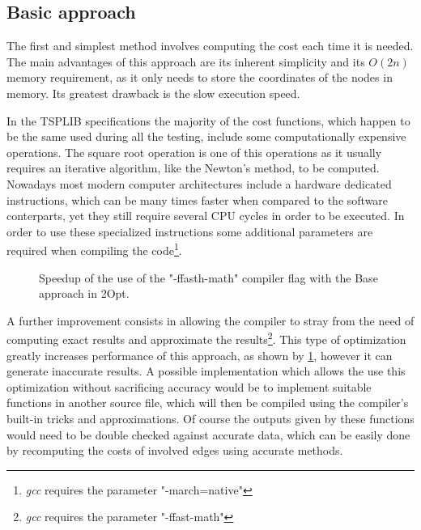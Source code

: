 \subsection{Basic approach}

The first and simplest method involves computing the cost each time it is needed. 
The main advantages of this approach are its inherent simplicity and its $O(2n)$ memory requirement, as it only needs to store the coordinates of the nodes in memory.
Its greatest drawback is the slow execution speed.

In the TSPLIB specifications the majority of the cost functions, which happen to be the same used during all the testing, include some computationally expensive operations.
The square root operation is one of this operations as it usually requires an iterative algorithm, like the Newton's method\cite{newtonMethod}, to be computed.
Nowadays most modern computer architectures include a hardware dedicated instructions, which can be many times faster when compared to the software conterparts, yet they still require several CPU cycles in order to be executed.
In order to use these specialized instructions some additional parameters are required when compiling the code\footnote{\textit{gcc} requires the parameter "-march=native"}.

\begin{figure}[htbp]
    \centering
    \caption{Speedup of the use of the "-ffasth-math" compiler flag with the Base approach in 2Opt.} \label{fig:baseHWSpecific}
\end{figure}

A further improvement consists in allowing the compiler to stray from the need of computing exact results and approximate the results\footnote{\textit{gcc} requires the parameter "-ffast-math"}.
This type of optimization greatly increases performance of this approach, as shown by \figurename{ \ref{fig:baseHWSpecific}}, however it can generate inaccurate results.
A possible implementation which allows the use this optimization without sacrificing accuracy would be to implement suitable functions in another source file, which will then be compiled using the compiler's built-in tricks and approximations.
Of course the outputs given by these functions would need to be double checked against accurate data, which can be easily done by recomputing the costs of involved edges using accurate methods.

